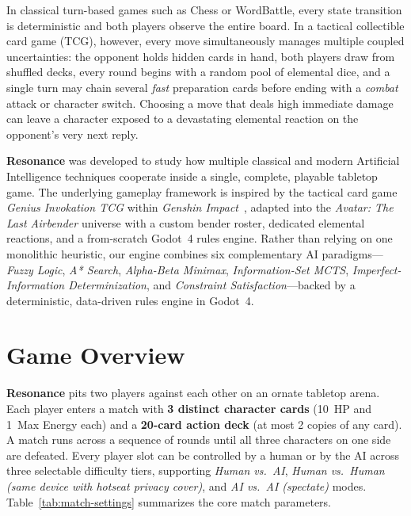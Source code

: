\documentclass[11pt,a4paper]{article}
\begin{document}
In classical turn-based games such as Chess or WordBattle, every state transition is deterministic and both players observe the entire board. In a tactical collectible card game (TCG), however, every move simultaneously manages multiple coupled uncertainties: the opponent holds hidden cards in hand, both players draw from shuffled decks, every round begins with a random pool of elemental dice, and a single turn may chain several \emph{fast} preparation cards before ending with a \emph{combat} attack or character switch. Choosing a move that deals high immediate damage can leave a character exposed to a devastating elemental reaction on the opponent's very next reply.

\textbf{Resonance} was developed to study how multiple classical and modern Artificial Intelligence techniques cooperate inside a single, complete, playable tabletop game. The underlying gameplay framework is inspired by the tactical card game \emph{Genius Invokation TCG} within \emph{Genshin Impact}~\cite{hoyoverse}, adapted into the \emph{Avatar: The Last Airbender} universe with a custom bender roster, dedicated elemental reactions, and a from-scratch Godot~4 rules engine. Rather than relying on one monolithic heuristic, our engine combines six complementary AI paradigms—\emph{Fuzzy Logic}, \emph{A* Search}, \emph{Alpha-Beta Minimax}, \emph{Information-Set MCTS}, \emph{Imperfect-Information Determinization}, and \emph{Constraint Satisfaction}—backed by a deterministic, data-driven rules engine in Godot~4.

\section{Game Overview}

\textbf{Resonance} pits two players against each other on an ornate tabletop arena. Each player enters a match with \textbf{3 distinct character cards} (10~HP and 1~Max Energy each) and a \textbf{20-card action deck} (at most 2 copies of any card). A match runs across a sequence of rounds until all three characters on one side are defeated. Every player slot can be controlled by a human or by the AI across three selectable difficulty tiers, supporting \emph{Human vs.\ AI}, \emph{Human vs.\ Human (same device with hotseat privacy cover)}, and \emph{AI vs.\ AI (spectate)} modes. Table~\ref{tab:match-settings} summarizes the core match parameters.
\end{document}
